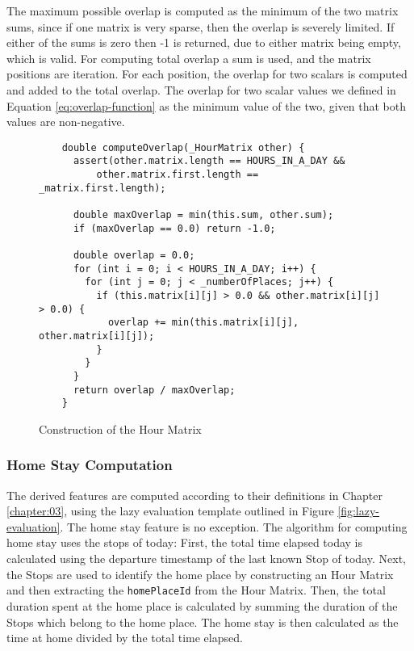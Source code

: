 The maximum possible overlap is computed as the minimum of the two matrix sums, since if one matrix is very sparse, then the overlap is severely limited. If either of the sums is zero then -1 is returned, due to either matrix being empty, which is valid. For computing total overlap a sum is used, and the matrix positions are iteration. For each position, the overlap for two scalars is computed and added to the total overlap. The overlap for two scalar values we defined in Equation \eqref{eq:overlap-function} as the minimum value of the two, given that both values are non-negative. 

\begin{figure}
    \centering
    \begin{verbatim}
    double computeOverlap(_HourMatrix other) {
      assert(other.matrix.length == HOURS_IN_A_DAY &&
          other.matrix.first.length == _matrix.first.length);
    
      double maxOverlap = min(this.sum, other.sum);
      if (maxOverlap == 0.0) return -1.0;
    
      double overlap = 0.0;
      for (int i = 0; i < HOURS_IN_A_DAY; i++) {
        for (int j = 0; j < _numberOfPlaces; j++) {
          if (this.matrix[i][j] > 0.0 && other.matrix[i][j] > 0.0) {
            overlap += min(this.matrix[i][j], other.matrix[i][j]);
          }
        }
      }
      return overlap / maxOverlap;
    }
    \end{verbatim}
    \caption{Construction of the Hour Matrix}
    \label{fig:hour-matrix-overlap}
\end{figure}


\subsubsection*{Home Stay Computation}
The derived features are computed according to their definitions in Chapter \ref{chapter:03}, using the lazy evaluation template outlined in Figure \ref{fig:lazy-evaluation}. The home stay feature is no exception. The algorithm for computing home stay uses the stops of today: First, the total time elapsed today is calculated using the departure timestamp of the last known Stop of today. Next, the Stops are used to identify the home place by constructing an Hour Matrix and then extracting the \verb|homePlaceId| from the Hour Matrix. Then, the total duration spent at the home place is calculated by summing the duration of the Stops which belong to the home place. The home stay is then calculated as the time at home divided by the total time elapsed.

